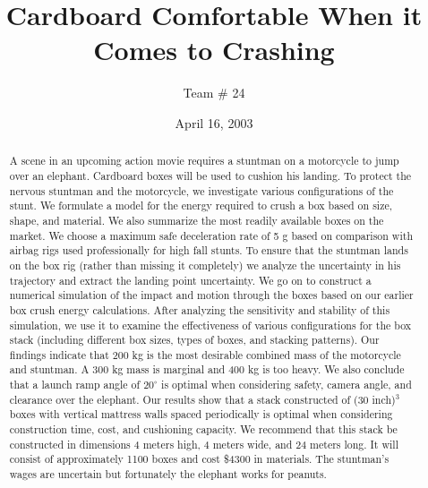 \documentclass[12pt,a4paper,titlepage]{article}
\begin{document}
\setlength{\parindent}{0pt} \setlength{\parskip}{2ex plus 0.5ex
minus 0.2ex}

\title{Cardboard Comfortable When it Comes to Crashing}
\author{Team \# 24}
\date{April 16, 2003}

\maketitle

\fancyhead{} \pagestyle{fancy}   \setlength{\headrulewidth}



\begin{abstract}


\noindent A scene in an upcoming action movie requires a stuntman
on a motorcycle to jump over an elephant.  Cardboard boxes will be
used to cushion his landing. To protect the nervous stuntman and
the motorcycle, we investigate various configurations of the
stunt.  We formulate a model for the energy required to crush a
box based on size, shape, and material.  We also summarize the
most readily available boxes on the market. We choose a maximum
safe deceleration rate of 5 g based on comparison with airbag rigs
used professionally for high fall stunts.  To ensure that the
stuntman lands on the box rig (rather than missing it completely)
we analyze the uncertainty in his trajectory and extract the
landing point uncertainty.  We go on to construct a numerical
simulation of the impact and motion through the boxes based on our
earlier box crush energy calculations.  After analyzing the
sensitivity and stability of this simulation, we use it to examine
the effectiveness of various configurations for the box stack
(including different box sizes, types of boxes, and stacking
patterns). Our findings indicate that 200 kg is the most desirable
combined mass of the motorcycle and stuntman. A 300 kg mass is
marginal and 400 kg is too heavy.  We also conclude that a launch
ramp angle of $20^\circ$ is optimal when considering safety,
camera angle, and clearance over the elephant. Our results show
that a stack constructed of (30 inch)$^3$ boxes with vertical
mattress walls spaced periodically is optimal when considering
construction time, cost, and cushioning capacity. We recommend
that this stack be constructed in dimensions 4 meters high, 4
meters wide, and 24 meters long. It will consist of approximately
1100 boxes and cost \$4300 in materials. The stuntman's wages are
uncertain but fortunately the elephant works for peanuts.


\end{abstract}
\end{document}
